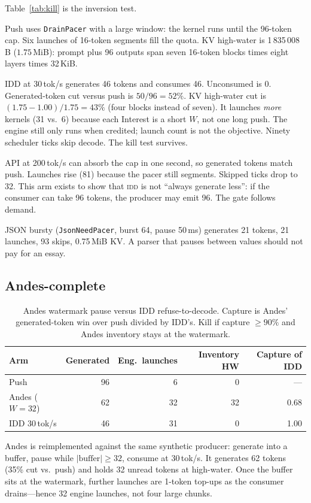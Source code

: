 \documentclass{article}
\theoremstyle{definition}
\newcommand{\idd}{\textsc{idd}}
\begin{document}
Table~\ref{tab:kill} is the inversion test.

Push uses \texttt{DrainPacer} with a large window: the kernel runs until the 96-token cap.
Six launches of 16-token segments fill the quota.
KV high-water is 1\,835\,008\,B ($1.75$\,MiB): prompt plus 96 outputs span seven 16-token blocks times eight layers times 32\,KiB.

IDD at 30\,tok/s generates 46 tokens and consumes 46.
Unconsumed is 0.
Generated-token cut versus push is $50/96 = 52\%$.
KV high-water cut is $(1.75-1.00)/1.75 = 43\%$ (four blocks instead of seven).
It launches \emph{more} kernels (31 vs.\ 6) because each Interest is a short $W$, not one long push.
The engine still only runs when credited; launch count is not the objective.
Ninety scheduler ticks skip decode.
The kill test survives.

API at 200\,tok/s can absorb the cap in one second, so generated tokens match push.
Launches rise (81) because the pacer still segments.
Skipped ticks drop to 32.
This arm exists to show that \idd{} is not ``always generate less'': if the consumer can take 96 tokens, the producer may emit 96.
The gate follows demand.

JSON bursty (\texttt{JsonNeedPacer}, burst 64, pause 50\,ms) generates 21 tokens, 21 launches, 93 skips, 0.75\,MiB KV.
A parser that pauses between values should not pay for an essay.

\subsection{Andes-complete}
\label{sec:andes}

\begin{table}[t]
\centering
\small
\caption{Andes watermark pause versus IDD refuse-to-decode. Capture is Andes' generated-token win over push divided by IDD's. Kill if capture $\ge 90\%$ and Andes inventory stays at the watermark.}
\label{tab:andes}
\begin{tabular}{lrrrr}
\toprule
Arm & Generated & Eng.\ launches & Inventory HW & Capture of IDD \\
\midrule
Push & 96 & 6 & 0 & --- \\
Andes ($W{=}32$) & 62 & 32 & 32 & 0.68 \\
IDD 30\,tok/s & 46 & 31 & 0 & 1.00 \\
\bottomrule
\end{tabular}
\end{table}

Andes is reimplemented against the same synthetic producer: generate into a buffer, pause while $\lvert \mathrm{buffer} \rvert \ge 32$, consume at 30\,tok/s.
It generates 62 tokens (35\% cut vs.\ push) and holds 32 unread tokens at high-water.
Once the buffer sits at the watermark, further launches are 1-token top-ups as the consumer drains---hence 32 engine launches, not four large chunks.
\end{document}
